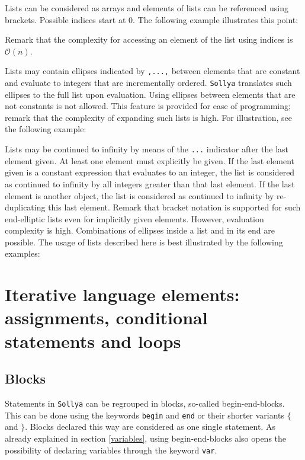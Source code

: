 \documentclass[a4paper]{article}
\newcommand{\key}[1]{\texttt{#1}}
\newcommand{\sollya}{\texttt{Sollya}\xspace}
\begin{document}


Lists can be considered as arrays and elements of lists can be
referenced using brackets. Possible indices start at $0$. The
following example illustrates this point:



Remark that the complexity for accessing an element of the list using
indices is $\mathcal{O}(n)$.

Lists may contain ellipses indicated by \texttt{,...,} between
elements that are constant and evaluate to integers that are
incrementally ordered. \sollya translates such ellipses to the full
list upon evaluation. Using ellipses between elements that are not
constants is not allowed. This feature is provided for ease of
programming; remark that the complexity of expanding such lists is
high. For illustration, see the following example:



Lists may be continued to infinity by means of the \texttt{...}
indicator after the last element given. At least one element must
explicitly be given. If the last element given is a constant
expression that evaluates to an integer, the list is considered as
continued to infinity by all integers greater than that last
element. If the last element is another object, the list is considered
as continued to infinity by re-duplicating this last element. Remark
that bracket notation is supported for such end-elliptic lists even
for implicitly given elements. However, evaluation complexity is
high. Combinations of ellipses inside a list and in its end are
possible. The usage of lists described here is best illustrated by the
following examples:



\section{Iterative language elements: assignments, conditional statements and loops}

\subsection{Blocks}

Statements in \sollya can be regrouped in blocks, so-called
begin-end-blocks.  This can be done using the keywords \key{begin} and
\key{end} or their shorter variants \key{$\lbrace$} and
\key{$\rbrace$}. Blocks declared this way are considered as one single
statement. As already explained in section \ref{variables}, using
begin-end-blocks also opens the possibility of declaring variables
through the keyword \key{var}. 
\end{document}
